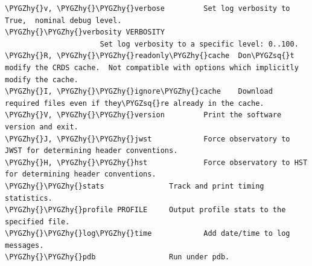 \documentclass[letterpaper,10pt,english]{sphinxmanual}
\def\PYGZhy{\char`\-}
\def\PYGZsq{\char`\'}
\begin{document}
\begin{Verbatim}[commandchars=\\\{\}]
\PYGZhy{}v, \PYGZhy{}\PYGZhy{}verbose         Set log verbosity to True,  nominal debug level.
\PYGZhy{}\PYGZhy{}verbosity VERBOSITY
                      Set log verbosity to a specific level: 0..100.
\PYGZhy{}R, \PYGZhy{}\PYGZhy{}readonly\PYGZhy{}cache  Don\PYGZsq{}t modify the CRDS cache.  Not compatible with options which implicitly modify the cache.
\PYGZhy{}I, \PYGZhy{}\PYGZhy{}ignore\PYGZhy{}cache    Download required files even if they\PYGZsq{}re already in the cache.
\PYGZhy{}V, \PYGZhy{}\PYGZhy{}version         Print the software version and exit.
\PYGZhy{}J, \PYGZhy{}\PYGZhy{}jwst            Force observatory to JWST for determining header conventions.
\PYGZhy{}H, \PYGZhy{}\PYGZhy{}hst             Force observatory to HST for determining header conventions.
\PYGZhy{}\PYGZhy{}stats               Track and print timing statistics.
\PYGZhy{}\PYGZhy{}profile PROFILE     Output profile stats to the specified file.
\PYGZhy{}\PYGZhy{}log\PYGZhy{}time            Add date/time to log messages.
\PYGZhy{}\PYGZhy{}pdb                 Run under pdb.
\end{Verbatim}
\end{document}
